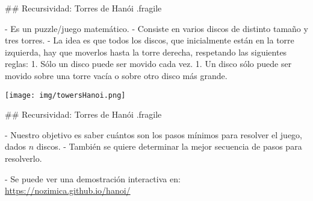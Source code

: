 ## Recursividad: Torres de Hanói {.fragile}

- Es un puzzle/juego matemático.
- Consiste en varios discos de distinto tamaño y tres torres.
- La idea es que todos los discos, que inicialmente están en la torre
izquierda, hay que moverlos hasta la torre derecha, respetando las siguientes reglas:
    1. Sólo un disco puede ser movido cada vez.
    1. Un disco sólo puede ser movido sobre una torre vacía o sobre otro disco más grande.

\centering    \texttt{[image: img/towersHanoi.png]}

## Recursividad: Torres de Hanói {.fragile}

- Nuestro objetivo es saber cuántos son los pasos mínimos para resolver el juego, dados
$n$ discos.
- También se quiere determinar la mejor secuencia de pasos para resolverlo.

- Se puede ver una demostración interactiva en: \url{https://nozimica.github.io/hanoi/}


